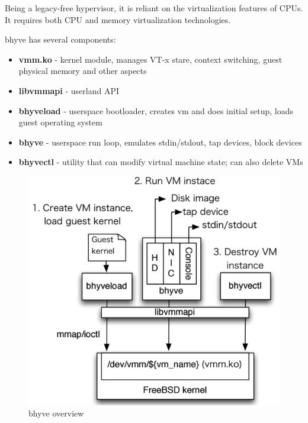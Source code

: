 Being a legacy-free hypervisor, it is reliant on the virtualization features of CPUs. It requires both CPU and memory virtualization technologies.

bhyve has several components\cite{intr-bhyve}\cite{extending-bhyve}:
\begin{itemize}
\item
\textbf{vmm.ko} - kernel module, manages VT-x stare, context switching, guest physical memory and other aspects
\item
\textbf{libvmmapi} - userland API
\item
\textbf{bhyveload} - userspace bootloader, creates vm and does initial setup, loads guest operating system
\item
\textbf{bhyve} - userspace run loop, emulates stdin/stdout, tap devices, block devices
\item
\textbf{bhyvectl} - utility that can modify virtual machine state; can also delete VMs
\end{itemize}

\begin{figure}[ht]
\centering
  \includegraphics[width=.6\linewidth]{img/bhyve.png}
  \caption{bhyve overview\cite{intr-bhyve}}
\end{figure}
